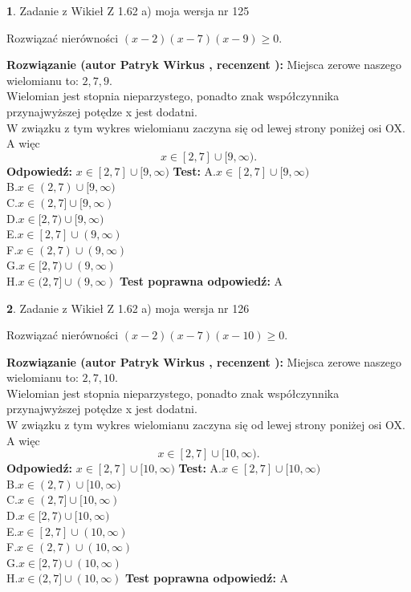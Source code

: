 \documentclass[12pt, a4paper]{article}
\theoremstyle{definition} %
\newtheorem{zad}{}
\newcommand{\zadStart}[1]{\begin{zad}#1\newline}
\newcommand{\zadStop}{\end{zad}}
\newcommand{\rozwStart}[2]{\noindent \textbf{Rozwiązanie (autor #1 , recenzent #2): }\newline}
\newcommand{\rozwStop}{\newline}
\newcommand{\odpStart}{\noindent \textbf{Odpowiedź:}\newline}
\newcommand{\odpStop}{\newline}
\newcommand{\testStart}{\noindent \textbf{Test:}\newline}
\newcommand{\testStop}{\newline}
\newcommand{\kluczStart}{\noindent \textbf{Test poprawna odpowiedź:}\newline}
\newcommand{\kluczStop}{\newline}
\begin{document}
\zadStart{Zadanie z Wikieł Z 1.62 a) moja wersja nr 125}

Rozwiązać nierówności $(x-2)(x-7)(x-9)\ge0$.
\zadStop
\rozwStart{Patryk Wirkus}{}
Miejsca zerowe naszego wielomianu to: $2, 7, 9$.\\
Wielomian jest stopnia nieparzystego, ponadto znak współczynnika przy\linebreak najwyższej potędze x jest dodatni.\\ W związku z tym wykres wielomianu zaczyna się od lewej strony poniżej osi OX. A więc $$x \in [2,7] \cup [9,\infty).$$
\rozwStop
\odpStart
$x \in [2,7] \cup [9,\infty)$
\odpStop
\testStart
A.$x \in [2,7] \cup [9,\infty)$\\
B.$x \in (2,7) \cup [9,\infty)$\\
C.$x \in (2,7] \cup [9,\infty)$\\
D.$x \in [2,7) \cup [9,\infty)$\\
E.$x \in [2,7] \cup (9,\infty)$\\
F.$x \in (2,7) \cup (9,\infty)$\\
G.$x \in [2,7) \cup (9,\infty)$\\
H.$x \in (2,7] \cup (9,\infty)$
\testStop
\kluczStart
A
\kluczStop



\zadStart{Zadanie z Wikieł Z 1.62 a) moja wersja nr 126}

Rozwiązać nierówności $(x-2)(x-7)(x-10)\ge0$.
\zadStop
\rozwStart{Patryk Wirkus}{}
Miejsca zerowe naszego wielomianu to: $2, 7, 10$.\\
Wielomian jest stopnia nieparzystego, ponadto znak współczynnika przy\linebreak najwyższej potędze x jest dodatni.\\ W związku z tym wykres wielomianu zaczyna się od lewej strony poniżej osi OX. A więc $$x \in [2,7] \cup [10,\infty).$$
\rozwStop
\odpStart
$x \in [2,7] \cup [10,\infty)$
\odpStop
\testStart
A.$x \in [2,7] \cup [10,\infty)$\\
B.$x \in (2,7) \cup [10,\infty)$\\
C.$x \in (2,7] \cup [10,\infty)$\\
D.$x \in [2,7) \cup [10,\infty)$\\
E.$x \in [2,7] \cup (10,\infty)$\\
F.$x \in (2,7) \cup (10,\infty)$\\
G.$x \in [2,7) \cup (10,\infty)$\\
H.$x \in (2,7] \cup (10,\infty)$
\testStop
\kluczStart
A
\kluczStop
\end{document}
